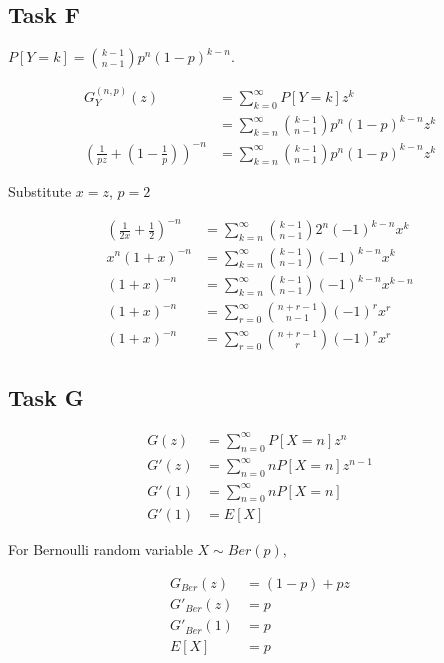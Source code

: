 \subsection{Task F}

$P[Y = k] = \binom{k-1}{n-1} p^n (1-p)^{k-n}$.

\begin{align*}
    G_Y^{(n, p)}(z) &= \sum_{k=0}^{\infty} P[Y = k]z^k \\
    &= \sum_{k=n}^{\infty} \binom{k-1}{n-1} p^n (1-p)^{k-n} z^k \\
    \left(\frac{1}{pz} + \left(1-\frac{1}{p}\right)\right)^{-n} &= \sum_{k=n}^{\infty} \binom{k-1}{n-1} p^n (1-p)^{k-n} z^k
\end{align*}

Substitute $x = z$, $p = 2$

\begin{align*}
    \left(\frac{1}{2x} + \frac{1}{2}\right)^{-n} &= \sum_{k=n}^{\infty} \binom{k-1}{n-1} 2^n (-1)^{k-n} x^{k} \\
    x^n (1+x)^{-n} &= \sum_{k=n}^{\infty} \binom{k-1}{n-1} (-1)^{k-n} x^{k} \\
    (1+x)^{-n} &= \sum_{k=n}^{\infty} \binom{k-1}{n-1} (-1)^{k-n} x^{k-n} \\
    (1+x)^{-n} &= \sum_{r=0}^{\infty} \binom{n+r-1}{n-1} (-1)^{r} x^{r} \\
    (1+x)^{-n} &= \sum_{r=0}^{\infty} \binom{n+r-1}{r} (-1)^{r} x^{r}
\end{align*}

\subsection{Task G}

\begin{align*}
    G(z) &= \sum_{n=0}^{\infty} P[X = n]z^n \\
    G'(z) &= \sum_{n=0}^{\infty} nP[X = n]z^{n-1} \\
    G'(1) &= \sum_{n=0}^{\infty} nP[X = n] \\
    G'(1) &= E[X]
\end{align*}

For Bernoulli random variable $X \sim Ber(p)$,

\begin{align*}
    G_{Ber}(z) &= (1-p) + pz \\
    G'_{Ber}(z) &= p \\
    G'_{Ber}(1) &= p \\
    E[X] &= p
\end{align*}

